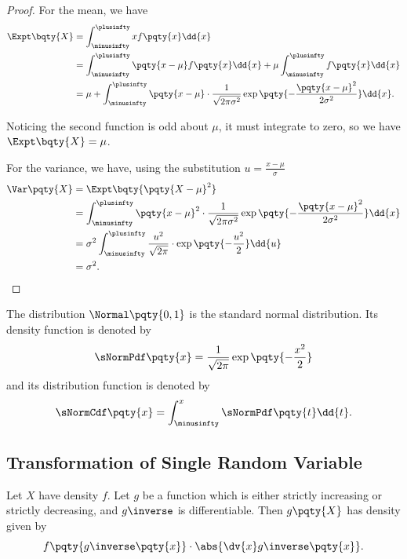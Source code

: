 \begin{proof}
    For the mean, we have
    \begin{align*}
        \Expt\bqty{X} &= \int_{\minusinfty}^{\plusinfty} x f\pqty{x} \dd{x} \\
        &= \int_{\minusinfty}^{\plusinfty} \pqty{x - \mu} f\pqty{x} \dd{x} + \mu \int_{\minusinfty}^{\plusinfty} f\pqty{x} \dd{x} \\
        &= \mu + \int_{\minusinfty}^{\plusinfty} \pqty{x - \mu} \cdot \frac{1}{\sqrt{2 \pi \sigma^2}} \exp\pqty{-\frac{\pqty{x - \mu}^2}{2 \sigma^2}} \dd{x}.
    \end{align*}

    Noticing the second function is odd about \(\mu\), it must integrate to zero, so we have \(\Expt\bqty{X} = \mu\).

    For the variance, we have, using the substitution \(u = \frac{x - \mu}{\sigma}\)
    \begin{align*}
        \Var\pqty{X} &= \Expt\bqty{\pqty{X - \mu}^2} \\
        &=  \int_{\minusinfty}^{\plusinfty} \pqty{x - \mu}^2 \cdot \frac{1}{\sqrt{2 \pi \sigma^2}} \exp\pqty{-\frac{\pqty{x - \mu}^2}{2 \sigma^2}} \dd{x} \\
        &= \sigma^2 \int_{\minusinfty}^{\plusinfty} \frac{u^2}{\sqrt{2\pi}} \cdot \exp\pqty{-\frac{u^2}{2}} \dd{u} \\
        &= \sigma^2.
    \end{align*}
\end{proof}

\begin{definition}
    \label{def:standard-normal}%
    The distribution \(\Normal\pqty{0, 1}\) is the standard normal distribution. Its density function is denoted by
    \[
        \sNormPdf\pqty{x} = \frac{1}{\sqrt{2\pi}} \exp\pqty{- \frac{x^2}{2}}
    \]
    and its distribution function is denoted by
    \[
        \sNormCdf\pqty{x} = \int_{\minusinfty}^{x} \sNormPdf\pqty{t} \dd{t}.
    \]  
\end{definition}

\subsection{Transformation of Single Random Variable}

\begin{theorem}
    \label{thm:transformation-of-random-variable}
    Let \(X\) have density \(f\). Let \(g\) be a function which is either strictly increasing or strictly decreasing, and \(g\inverse\) is differentiable. Then \(g\pqty{X}\) has density given by
    \[
        f\pqty{g\inverse\pqty{x}} \cdot \abs{\dv{x} g\inverse\pqty{x}}.
    \]
\end{theorem}

